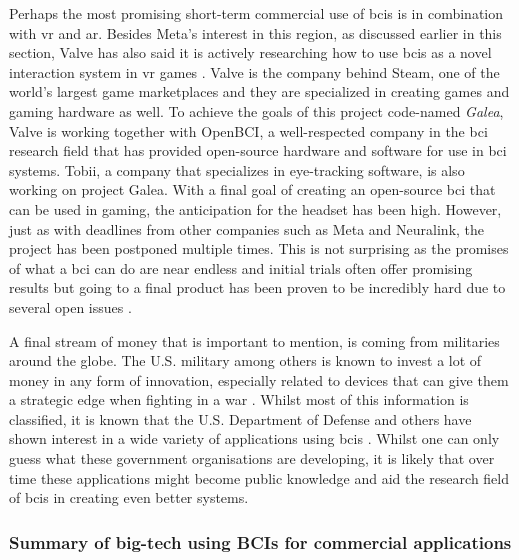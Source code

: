 Perhaps the most promising short-term commercial use of \glspl{bci} is in combination with \gls{vr} and \gls{ar}.
Besides Meta's interest in this region, as discussed earlier in this section, Valve has also said it is actively researching how to use \glspl{bci} as a novel interaction system in \gls{vr} games \citep{valve_bci_interest}.
Valve is the company behind Steam, one of the world's largest game marketplaces and they are specialized in creating games and gaming hardware as well.
To achieve the goals of this project code-named \textit{Galea}, Valve is working together with OpenBCI, a well-respected company in the \gls{bci} research field that has provided open-source hardware and software for use in \gls{bci} systems.
Tobii, a company that specializes in eye-tracking software, is also working on project Galea.
With a final goal of creating an open-source \gls{bci} that can be used in gaming, the anticipation for the headset has been high.
However, just as with deadlines from other companies such as Meta and Neuralink, the project has been postponed multiple times.
This is not surprising as the promises of what a \gls{bci} can do are near endless and initial trials often offer promising results but going to a final product has been proven to be incredibly hard due to several open issues \citep{bci_review_arnau}.

A final stream of money that is important to mention, is coming from militaries around the globe.
The U.S. military among others is known to invest a lot of money in any form of innovation, especially related to devices that can give them a strategic edge when fighting in a war \citep{military_ai_money, military_ai_money_eu}.
Whilst most of this information is classified, it is known that the U.S. Department of Defense and others have shown interest in a wide variety of applications using \glspl{bci} \citep{bci_military}.
Whilst one can only guess what these government organisations are developing, it is likely that over time these applications might become public knowledge and aid the research field of \glspl{bci} in creating even better systems.


\subsubsection{Summary of big-tech using BCIs for commercial applications}
\label{subsubsec:bci_gaining_popularity_big_tech_summary}

